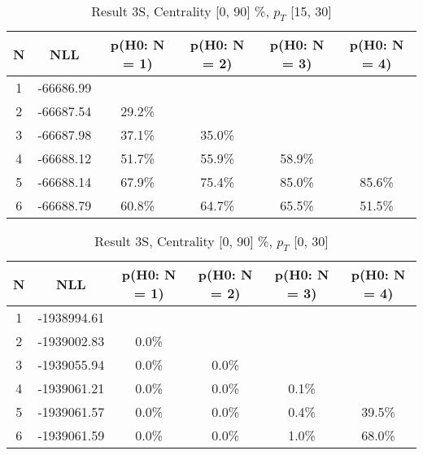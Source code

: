 \begin{table}[htb]
	\begin{center}
	\caption{Result 3S, Centrality [0, 90] \%, $p_{T}$ [15, 30] \GeV
}
{\footnotesize\renewcommand{\arraystretch}{1.4}
		\begin{tabular}{cc||>{\columncolor[gray]{0.8}}cccc}
			N & NLL & p(H0: N = 1) & p(H0: N = 2) & p(H0: N = 3) & p(H0: N = 4)\\ 
		\hline
1 & -66686.99 & & & &\\
2 & -66687.54 & 29.2\% & & &\\
3 & -66687.98 & 37.1\% & 35.0\% & &\\
4 & -66688.12 & 51.7\% & 55.9\% & 58.9\% &\\
5 & -66688.14 & 67.9\% & 75.4\% & 85.0\% & 85.6\%\\
6 & -66688.79 & 60.8\% & 64.7\% & 65.5\% & 51.5\% \\
	\end{tabular}
		\label{tab:lab}
	}
	\end{center}\end{table}

\begin{table}[htb]
	\begin{center}
	\caption{Result 3S, Centrality [0, 90] \%, $p_{T}$ [0, 30] \GeV
}
{\footnotesize\renewcommand{\arraystretch}{1.4}
		\begin{tabular}{cc||ccc>{\columncolor[gray]{0.8}}c}
			N & NLL & p(H0: N = 1) & p(H0: N = 2) & p(H0: N = 3) & p(H0: N = 4)\\ 
		\hline
1 & -1938994.61 & & & &\\
2 & -1939002.83 & 0.0\% & & &\\
3 & -1939055.94 & 0.0\% & 0.0\% & &\\
4 & -1939061.21 & 0.0\% & 0.0\% & 0.1\% &\\
5 & -1939061.57 & 0.0\% & 0.0\% & 0.4\% & 39.5\%\\
6 & -1939061.59 & 0.0\% & 0.0\% & 1.0\% & 68.0\% \\
	\end{tabular}
		\label{tab:lab}
	}
	\end{center}\end{table}

